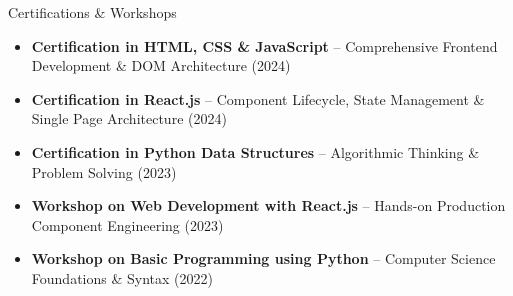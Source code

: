\documentclass{resume} %
\begin{document}
\begin{rSection}{Certifications \& Workshops}
\begin{itemize}[leftmargin=1.2em, itemsep=-0.4em, topsep=-0.2em]
\item \textbf{Certification in HTML, CSS \& JavaScript} -- Comprehensive Frontend Development \& DOM Architecture (2024)
\item \textbf{Certification in React.js} -- Component Lifecycle, State Management \& Single Page Architecture (2024)
\item \textbf{Certification in Python Data Structures} -- Algorithmic Thinking \& Problem Solving (2023)
\item \textbf{Workshop on Web Development with React.js} -- Hands-on Production Component Engineering (2023)
\item \textbf{Workshop on Basic Programming using Python} -- Computer Science Foundations \& Syntax (2022)
\end{itemize}
\end{rSection}
\end{document}
